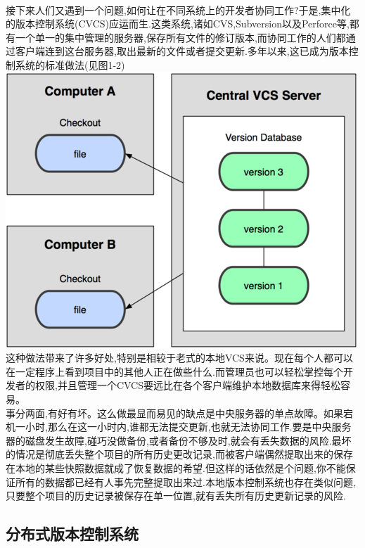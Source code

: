\documentclass{book}
\begin{document}
	\paragraph{}
	接下来人们又遇到一个问题,如何让在不同系统上的开发者协同工作?于是,集中化的版本控制系统(CVCS)应运而生.这类系统,诸如CVS,Subversion以及Perforce等,都有一个单一的集中管理的服务器,保存所有文件的修订版本,而协同工作的人们都通过客户端连到这台服务器,取出最新的文件或者提交更新.多年以来,这已成为版本控制系统的标准做法(见图1-2)\\
	\includegraphics{1-2.png}\\
	这种做法带来了许多好处,特别是相较于老式的本地VCS来说。现在每个人都可以在一定程序上看到项目中的其他人正在做些什么.而管理员也可以轻松掌控每个开发者的权限,并且管理一个CVCS要远比在各个客户端维护本地数据库来得轻松容易。\\
	事分两面,有好有坏。这么做最显而易见的缺点是中央服务器的单点故障。如果宕机一小时,那么在这一小时内,谁都无法提交更新,也就无法协同工作.要是中央服务器的磁盘发生故障,碰巧没做备份,或者备份不够及时,就会有丢失数据的风险.最坏的情况是彻底丢失整个项目的所有历史更改记录,而被客户端偶然提取出来的保存在本地的某些快照数据就成了恢复数据的希望.但这样的话依然是个问题,你不能保证所有的数据都已经有人事先完整提取出来过.本地版本控制系统也存在类似问题,只要整个项目的历史记录被保存在单一位置,就有丢失所有历史更新记录的风险.\\
	\subsection{分布式版本控制系统}
\end{document}
